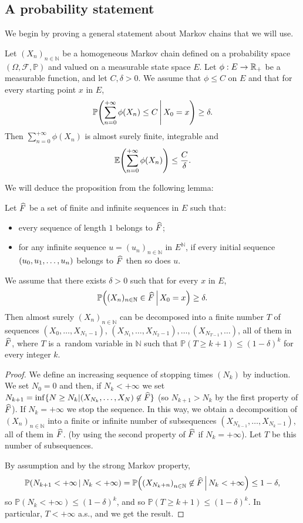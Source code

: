 \documentclass[AHL,Unicode,longabstracts,published]{cedram}
\newcommand{\bbP}{\mathbb{P}}
\newcommand{\R}{\mathbb{R}}
\newcommand{\clF}{\mathcal{F}}
\newcommand{\N}{\mathbb{N}}
\newcommand{\E}{\mathbb{E}}
\renewcommand*{\to}{\mathchoice{\longrightarrow}{\rightarrow}{\rightarrow}{\rightarrow}}
\let\originalleft\left
\let\originalright\right
\renewcommand{\left}{\mathopen{}\mathclose\bgroup\originalleft}
\renewcommand{\right}{\aftergroup\egroup\originalright}
\let\oldhat\hat
\renewcommand*{\hat}[1]{\mathchoice{\widehat{#1}}{\widehat{#1}}{\oldhat{#1}}{\oldhat{#1}}}
\newcommand{\R}{\mathbb{R}}
\begin{document}
\subsection{A probability statement} We begin by proving a general statement about Markov chains that we will use.

\begin{prop}\label{Markovsum}
Let $(X_n)_{n\in\N}$ be a homogeneous Markov chain defined on a probability space $(\Omega,\clF,\bbP)$ and valued on a measurable state space $E$. Let $\phi:E\to \R_+$ be a measurable function, and let $C,\delta>0$. We assume that $\phi\leq C$ on $E$ and that for every starting point $x$ in $E$,
\[
\bbP\left(\sum_{n=0}^{+\infty}\phi(X_n)\leq C\,\middle|\,X_0=x\right)\geq \delta.
\]
Then $ \sum_{n=0}^{+\infty}\phi(X_n)$ is almost surely finite, integrable and
\[
\E\left(\sum_{n=0}^{+\infty}\phi(X_n)\right)\leq \frac{C}{\delta}.
\]
\end{prop}

We will deduce the proposition from the following lemma:

\begin{lemm}\label{Markovlemma}
Let $\hat{F}$ be a set of finite and infinite sequences in $E$ such that:
\begin{itemize}
\item every sequence of length $1$ belongs to $\hat{F}$;
\item for any infinite sequence $u=(u_n)_{n\in\N}$ in $E^\N$, if every initial sequence $(u_0,\linebreak u_1,\dots,u_n)$ belongs to $\hat{F}$ then so does $u$.
\end{itemize}
We assume that there exists $\delta>0$ such that for every $x$ in $E$,
\[
\bbP\left((X_n)_{n\in\N}\in \hat{F}\,\middle|\,X_0=x\right)\geq \delta.
\]
Then almost surely $(X_n)_{n\in\N}$ can be decomposed into a finite number $T$ of sequences $(X_0,\dots,X_{N_1-1})$, $(X_{N_1},\dots,X_{N_2-1}),\dots,(X_{N_{T-1}},\dots)$, all of them in $\hat{F}$, where $T$ is a~random variable in $\N$ such that $\bbP(T\geq k+1)\leq (1-\delta)^k$ for every integer $k$.
\end{lemm}
\begin{proof}
We define an increasing sequence of stopping times $(N_k)$ by induction. We set $N_0=0$ and then, if $N_k<+\infty$ we set $N_{k+1}=\inf\{N\geq N_k|(X_{N_k},\dots, X_N)\not\in \hat{F}\}$ (so $N_{k+1}>N_k$ by the first property of $\hat{F}$). If $N_k=+\infty$ we stop the sequence. In this way, we obtain a decomposition of $(X_n)_{n\in\N}$ into a finite or infinite number of subsequences $(X_{N_{k-1}},\dots, X_{N_k-1})$, all of them in $\hat{F}$. (by using the second property of $\hat{F}$ if $N_k=+\infty$). Let $T$ be this number of subsequences.

By assumption and by the strong Markov property,
\[
\bbP\left(N_{k+1}<+\infty\,\middle|\,N_k<+\infty\right)=\bbP\left(\left(X_{N_k+n}\right)_{n\in\N}\not\in \hat{F}\,\middle|\,N_k<+\infty\right)\leq 1-\delta,
\]
so $\bbP(N_k<+\infty)\leq (1-\delta)^k$, and so $\bbP(T\geq k+1)\leq (1-\delta)^k$. In particular, $T<+\infty$ a.s., and we get the result.
\end{proof}
\end{document}
